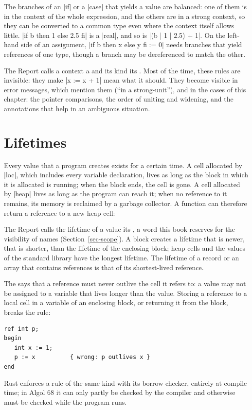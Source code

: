 The branches of an \code|if| or a \code|case| that yields a value are
balanced: one of them is in the context of the whole expression, and the
others are in a strong context, so they can be converted to a common
type even where the context itself allows little. \code|if b then 1 else 2.5 fi|
is a \code|real|, and so is \code|(b | 1 | 2.5) + 1|. On the left-hand
side of an assignment, \code|if b then x else y fi := 0| needs branches
that yield references of one type, though a branch may be dereferenced to
match the other.

The Report calls a context a  and its kind its
. Most of the time, these rules are invisible: they make
\code|x := x + 1| mean what it should. They become visible in error
messages, which mention them (``in a strong-unit''), and in the cases of
this chapter: the pointer comparisons, the order of uniting and widening,
and the annotations that help in an ambiguous situation.

\section{Lifetimes}\label{sec-lifetimes}

Every value that a program creates exists for a certain time. A cell
allocated by \code|loc|, which includes every variable declaration,
lives as long as the block in which it is allocated is running; when the
block ends, the cell is gone. A cell allocated by \code|heap| lives as
long as the program can reach it; when no reference to it remains, its
memory is reclaimed by a garbage collector. A function can therefore
return a reference to a new heap cell:


The Report calls the lifetime of a value its , a word this book
reserves for the visibility of names (Section~\ref{sec-scope}). A block
creates a lifetime that is newer, that is shorter, than the lifetime of
the enclosing block; heap cells and the values of the standard library
have the longest lifetime. The lifetime of a record or an array that
contains references is that of its shortest-lived reference.

The  says that a reference must never outlive the
cell it refers to: a value may not be assigned to a variable that lives
longer than the value. Storing a reference to a local cell in a variable
of an enclosing block, or returning it from the block, breaks the rule:
\begin{lstlisting}
ref int p;
begin
   int x := 1;
   p := x          { wrong: p outlives x }
end
\end{lstlisting}
Rust enforces a rule of the same kind with its borrow checker, entirely
at compile time; in Algol 68 it can only partly be checked by the
compiler and otherwise must be checked while the program runs.

